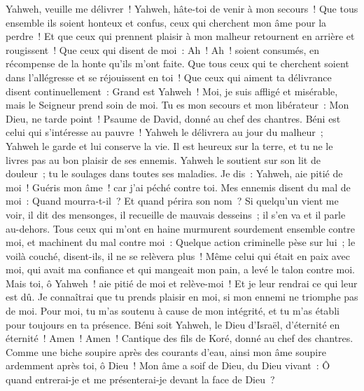 \begin{multicols}{2}
Yahweh, veuille me délivrer~! Yahweh, hâte-toi de venir à mon secours~!
Que tous ensemble ils soient honteux et confus, ceux qui cherchent mon âme pour la perdre~! Et que ceux qui prennent plaisir à mon malheur retournent en arrière et rougissent~!
Que ceux qui disent de moi~: Ah~! Ah~! soient consumés, en récompense de la honte qu'ils m'ont faite.
Que tous ceux qui te cherchent soient dans l'allégresse et se réjouissent en toi~! Que ceux qui aiment ta délivrance disent continuellement~: Grand est Yahweh~!
Moi, je suis affligé et misérable, mais le Seigneur prend soin de moi. Tu es mon secours et mon libérateur~: Mon Dieu, ne tarde point~!
\VerseOne{}Psaume de David, donné au chef des chantres.
Béni est celui qui s'intéresse au pauvre~! Yahweh le délivrera au jour du malheur~;
Yahweh le garde et lui conserve la vie. Il est heureux sur la terre, et tu ne le livres pas au bon plaisir de ses ennemis.
Yahweh le soutient sur son lit de douleur~; tu le soulages dans toutes ses maladies.
Je dis~: Yahweh, aie pitié de moi~! Guéris mon âme~! car j'ai péché contre toi.
Mes ennemis disent du mal de moi~: Quand mourra-t-il~? Et quand périra son nom~?
Si quelqu'un vient me voir, il dit des mensonges, il recueille de mauvais desseins~; il s'en va et il parle au-dehors.
Tous ceux qui m'ont en haine murmurent sourdement ensemble contre moi, et machinent du mal contre moi~:
Quelque action criminelle pèse sur lui~; le voilà couché, disent-ils, il ne se relèvera plus~!
Même celui qui était en paix avec moi, qui avait ma confiance et qui mangeait mon pain, a levé le talon contre moi.
Mais toi, ô Yahweh~! aie pitié de moi et relève-moi~! Et je leur rendrai ce qui leur est dû.
Je connaîtrai que tu prends plaisir en moi, si mon ennemi ne triomphe pas de moi.
Pour moi, tu m'as soutenu à cause de mon intégrité, et tu m'as établi pour toujours en ta présence.
Béni soit Yahweh, le Dieu d'Israël, d'éternité en éternité~! Amen~! Amen~!
\VerseOne{}Cantique des fils de Koré, donné au chef des chantres.
Comme une biche soupire après des courants d'eau, ainsi mon âme soupire ardemment après toi, ô Dieu~!
Mon âme a soif de Dieu, du Dieu vivant~: Ô quand entrerai-je et me présenterai-je devant la face de Dieu~?

\end{multicols}
